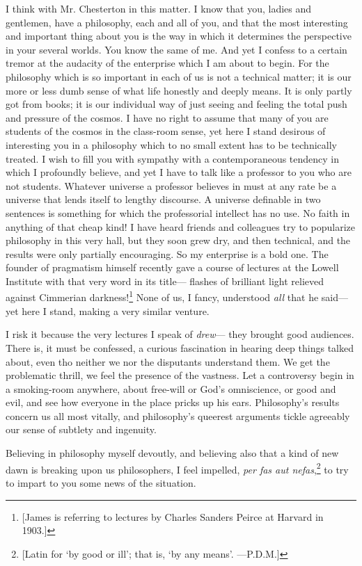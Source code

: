 \documentclass[]{article}
\begin{document}
I think with Mr. Chesterton in this matter. I know that you, ladies and
gentlemen, have a philosophy, each and all of you, and that the most
interesting and important thing about you is the way in which it
determines the perspective in your several worlds. You know the same
of me. And yet I confess to a certain tremor at the audacity of the
enterprise which I am about to begin. For the philosophy which is so
important in each of us is not a technical matter; it is our more or
less dumb sense of what life honestly and deeply means. It is only
partly got from books; it is our individual way of just seeing and
feeling the total push and pressure of the cosmos. I have no right to
assume that many of you are students of the cosmos in the class-room
sense, yet here I stand desirous of interesting you in a philosophy
which to no small extent has to be technically treated. I wish to fill
you with sympathy with a contemporaneous tendency in which I profoundly
believe, and yet I have to talk like a professor to you who are not
students. Whatever universe a professor believes in must at any rate be
a universe that lends itself to lengthy discourse. A universe definable
in two sentences is something for which the professorial intellect has
no use. No faith in anything of that cheap kind! I have heard friends
and colleagues try to popularize philosophy in this very hall, but they
soon grew dry, and then technical, and the results were only partially
encouraging. So my enterprise is a bold one. The founder of pragmatism
himself recently gave a course of lectures at the Lowell Institute with
that very word in its title--- flashes of brilliant light relieved
against Cimmerian darkness!\footnote{[James is referring to lectures by Charles Sanders Peirce at Harvard in 1903.]}
None of us, I fancy, understood \emph{all} that he
said--- yet here I stand, making a very similar venture.

I risk it because the very lectures I speak of \emph{drew}--- they brought good
audiences. There is, it must be confessed, a curious fascination in
hearing deep things talked about, even tho neither we nor the disputants
understand them. We get the problematic thrill, we feel the presence of
the vastness. Let a controversy begin in a smoking-room anywhere, about
free-will or God's omniscience, or good and evil, and see how everyone
in the place pricks up his ears. Philosophy's results concern us all
most vitally, and philosophy's queerest arguments tickle agreeably our
sense of subtlety and ingenuity.

Believing in philosophy myself devoutly, and believing also that a kind
of new dawn is breaking upon us philosophers, I feel impelled, \emph{per fas
aut nefas},\footnote{[Latin for `by good or ill'; that is, `by any means'. ---P.D.M.]} to try to impart to you some news of the situation.
\end{document}
